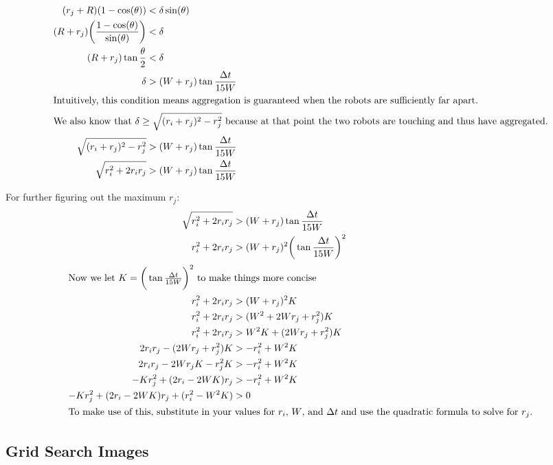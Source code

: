 \documentclass[conference]{IEEEtran}
\begin{document}
{\begin{align*}
        (r_j+R)(1 - \cos(\theta)) &< \delta\sin(\theta) \\
        (R+r_j)\bigg(\frac{1 - \cos(\theta)}{\sin(\theta)}\bigg) &< \delta \\
        (R+r_j)\tan{\frac{\theta}{2}} &< \delta \\
        \delta &> (W+r_j)\tan{\frac{\Delta t}{15W}} \\
        \intertext{Intuitively, this condition means aggregation is guaranteed when the robots are sufficiently far apart.}
        \intertext{We also know that $\delta\geq\sqrt{(r_i+r_j)^2-r_j^2}$ because at that point the two robots are touching and thus have aggregated.}
        \sqrt{(r_i+r_j)^2 - r_j^2} &> (W+r_j)\tan{\frac{\Delta t}{15W}} \\
        \sqrt{r^2_i + 2r_ir_j} &> (W+r_j)\tan{\frac{\Delta t}{15W}} \\
      \end{align*}
    }

    \pagebreak
    For further figuring out the maximum $r_j$:
    \begin{align*}
        \sqrt{r^2_i + 2r_ir_j} &> (W+r_j)\tan{\frac{\Delta t}{15W}} \\
        r^2_i + 2r_ir_j &> (W+r_j)^2\bigg(\tan{\frac{\Delta t}{15W}}\bigg)^2 \\
        \intertext{Now we let $K=\bigg(\tan{\frac{\Delta t}{15W}}\bigg)^2$ to make things more concise}
        r^2_i + 2r_ir_j &> (W+r_j)^2K \\
        r^2_i + 2r_ir_j &> (W^2+2Wr_j+r_j^2)K \\
        r^2_i + 2r_ir_j &> W^2K+(2Wr_j+r_j^2)K \\
        2r_ir_j - (2Wr_j+r_j^2)K&> -r^2_i + W^2K \\
        2r_ir_j - 2Wr_jK-r_j^2K&> -r^2_i + W^2K \\
        -Kr_j^2 + (2r_i - 2WK)r_j &> -r^2_i + W^2K \\
        -Kr_j^2 + (2r_i - 2WK)r_j + (r^2_i - W^2K) &> 0\\
      \intertext{To make use of this, substitute in your values for $r_i$, $W$, and $\Delta t$ and use the quadratic formula to solve for $r_j$.}
    \end{align*}

  \pagebreak
  \subsection{Grid Search Images} \label{section:grid_search_images}
\end{document}

